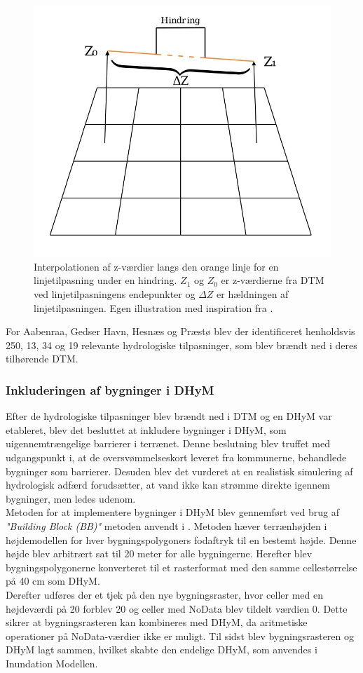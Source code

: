 \begin{figure}[H]
    \centering
    \includegraphics[width=0.5\linewidth]{images/metode/dtm_hydro_z.jpg}
    \caption{Interpolationen af z-værdier langs den orange linje for en linjetilpasning under en hindring. $Z_1$ og $Z_0$ er z-værdierne fra DTM ved linjetilpasningens endepunkter og $\Delta{Z}$ er hældningen af linjetilpasningen. Egen illustration med inspiration fra \cite{balstrom_identification_2024}.}
    \label{Figur: Interpolation af Z-værdier}
\end{figure}

For Aabenraa, Gedser Havn, Hesnæs og Præstø blev der identificeret henholdsvis 250, 13, 34 og 19 relevante hydrologiske tilpasninger, som blev brændt ned i deres tilhørende DTM.


\subsubsection{Inkluderingen af bygninger i DHyM} \label{Afsnit: Inklusion af bygninger i DHyM}

Efter de hydrologiske tilpasninger blev brændt ned i DTM og en DHyM var etableret, blev det besluttet at inkludere bygninger i DHyM, som uigennemtrængelige barrierer i terrænet. Denne beslutning blev truffet med udgangspunkt i, at de oversvømmelseskort leveret fra kommunerne, behandlede bygninger som barrierer. Desuden blev det vurderet at en realistisk simulering af hydrologisk adfærd forudsætter, at vand ikke kan strømme direkte igennem bygninger, men ledes udenom. \\

Metoden for at implementere bygninger i DHyM blev gennemført ved brug af \textit{"Building Block (BB)"} metoden anvendt i \cite{khosh_bin_ghomash_technical_2024}. Metoden hæver terrænhøjden i højdemodellen for hver bygningspolygoners fodaftryk til en bestemt højde. Denne højde blev arbitrært sat til 20 meter for alle bygningerne. Herefter blev bygningspolygonerne konverteret til et rasterformat med den samme cellestørrelse på 40 cm som DHyM. \\
Derefter udføres der et tjek på den nye bygningsraster, hvor celler med en højdeværdi på 20 forblev 20 og celler med NoData blev tildelt værdien 0. Dette sikrer at bygningsrasteren kan kombineres med DHyM, da aritmetiske operationer på NoData-værdier ikke er muligt. Til sidst blev bygningsrasteren og DHyM lagt sammen, hvilket skabte den endelige DHyM, som anvendes i Inundation Modellen.



